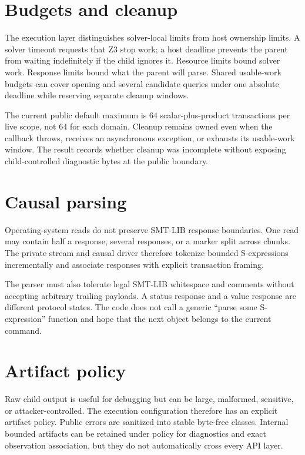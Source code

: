 \documentclass[10pt,letterpaper,oneside]{report}
\begin{document}
\section{Budgets and cleanup}

The execution layer distinguishes solver-local limits from host ownership limits. A solver timeout requests that Z3 stop work; a host deadline prevents the parent from waiting indefinitely if the child ignores it. Resource limits bound solver work. Response limits bound what the parent will parse. Shared usable-work budgets can cover opening and several candidate queries under one absolute deadline while reserving separate cleanup windows.

The current public default maximum is $64$ scalar-plus-product transactions per live scope, not $64$ for each domain. Cleanup remains owned even when the callback throws, receives an asynchronous exception, or exhausts its usable-work window. The result records whether cleanup was incomplete without exposing child-controlled diagnostic bytes at the public boundary.

\section{Causal parsing}

Operating-system reads do not preserve SMT-LIB response boundaries. One read may contain half a response, several responses, or a marker split across chunks. The private stream and causal driver therefore tokenize bounded S-expressions incrementally and associate responses with explicit transaction framing.

The parser must also tolerate legal SMT-LIB whitespace and comments without accepting arbitrary trailing payloads. A status response and a value response are different protocol states. The code does not call a generic ``parse some S-expression'' function and hope that the next object belongs to the current command.

\section{Artifact policy}

Raw child output is useful for debugging but can be large, malformed, sensitive, or attacker-controlled. The execution configuration therefore has an explicit artifact policy. Public errors are sanitized into stable byte-free classes. Internal bounded artifacts can be retained under policy for diagnostics and exact observation association, but they do not automatically cross every API layer.
\end{document}
